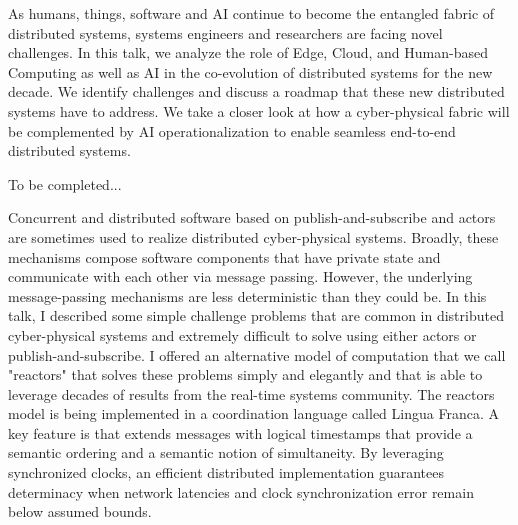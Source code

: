 \documentclass[a4paper,UKenglish]{dagrep-v2018}
\begin{document}
\license

As humans, things, software and AI continue to become the entangled fabric of distributed systems, systems engineers and researchers are facing novel challenges. In this talk, we analyze the role of Edge, Cloud, and Human-based Computing as well as AI in the co-evolution of distributed systems for the new decade. We identify challenges and discuss a roadmap that these new distributed systems have to address. We take a closer look at how a cyber-physical fabric will be complemented by AI operationalization to enable seamless end-to-end distributed systems.


\license

To be completed...


\license

Concurrent and distributed software based on publish-and-subscribe and actors are sometimes used to realize distributed cyber-physical systems. Broadly, these mechanisms compose software components that have private state and communicate with each other via message passing. However, the underlying message-passing mechanisms are less deterministic than they could be. In this talk, I described some simple challenge problems that are common in distributed cyber-physical systems and extremely difficult to solve using either actors or publish-and-subscribe. I  offered an alternative model of computation that we call "reactors" that solves these problems simply and elegantly and that is able to leverage decades of results from the real-time systems community. The reactors model is being implemented in a coordination language called Lingua Franca. A key feature is that extends messages with logical timestamps that provide a semantic ordering and a semantic notion of simultaneity. By leveraging synchronized clocks, an efficient distributed implementation guarantees determinacy when network latencies and clock synchronization error remain below assumed bounds.

\end{document}
